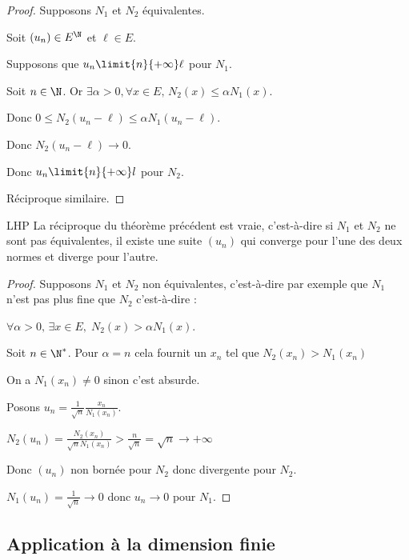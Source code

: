 \begin{proof}
    Supposons $N_1$ et $N_2$ équivalentes.

    Soit $(u_n) \in E^{\N}$ et $\ell \in E$.

    Supposons que $u_n \limit{n}{+\infty} \ell$ pour $N_1$. 

    Soit $n \in \N$. 
    Or $\exists \alpha > 0, \forall x \in E, \, N_2(x) \leqslant \alpha N_1(x)$.

    Donc $0 \leqslant N_2(u_n - \ell) \leqslant \alpha N_1(u_n - \ell)$.

    Donc $N_2(u_n - \ell) \to 0$.

    Donc $u_n \limit{n}{+\infty} l$ pour $N_2$.

    Réciproque similaire.
\end{proof}

\begin{theoreme}{LHP}{}
    La réciproque du théorème précédent est vraie, c'est-à-dire si $N_1$ et $N_2$ ne sont pas 
    équivalentes, il existe une suite $(u_n)$ qui converge pour l'une des deux normes 
    et diverge pour l'autre. 
\end{theoreme}


\begin{proof}
    Supposons $N_1$ et $N_2$ non équivalentes, c'est-à-dire par exemple que $N_1$ n'est pas plus 
    fine que $N_2$ c'est-à-dire : 

    $\forall \alpha >0, \, \exists x \in E, \; N_2(x) > \alpha N_1(x)$.

    Soit $n \in \N^*$. Pour $\alpha = n$ cela fournit un $x_n$ tel que $N_2(x_n) > N_1(x_n)$

    On a $N_1(x_n) \neq 0$ sinon c'est absurde.

    Posons $\displaystyle u_n = \frac 1 {\sqrt n}\frac{x_n}{N_1(x_n)}$.

    $\displaystyle N_2(u_n) = \frac{N_2(x_n)}{\sqrt n N_1(x_n)} > \frac n {\sqrt n} = \sqrt n \to + \infty$

    Donc $(u_n)$ non bornée pour $N_2$ donc divergente pour $N_2$. 

    $N_1(u_n) =  \frac 1 {\sqrt n} \to 0$ donc $u_n \to 0$ pour $N_1$.
\end{proof}

\subsection{Application à la dimension finie}

